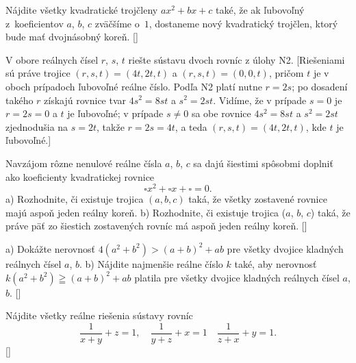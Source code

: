 {\D
Nájdite všetky kvadratické trojčleny
$ax^2  + bx + c$
také, že ak ľubovoľný z~koeficientov $a$, $b$, $c$ zväčšíme
o~$1$, dostaneme nový kvadratický trojčlen, ktorý bude mať
dvojnásobný koreň.
[]

V obore reálnych čísel $r$, $s$, $t$ riešte sústavu dvoch rovníc
z úlohy N2.
[Riešeniami sú práve trojice $(r,s,t)=(4t,2t,t)$ a
$(r,s,t)=(0,0,t)$, pričom $t$ je v oboch prípadoch ľubovoľné reálne
číslo. Podľa N2 platí nutne $r=2s$; po dosadení takého $r$
získajú rovnice tvar $4s^2=8st$ a $s^2=2st$. Vidíme, že v prípade
$s=0$ je $r=2s=0$ a $t$ je ľubovoľné; v prípade $s\ne0$ sa
obe rovnice $4s^2=8st$ a $s^2=2st$ zjednodušia na $s=2t$, takže
$r=2s=4t$, a teda $(r,s,t)=(4t,2t,t)$, kde $t$ je ľubovoľné.]

Navzájom rôzne nenulové reálne čísla $a$, $b$, $c$ sa dajú šiestimi spôsobmi
doplniť ako koeficienty kvadratickej rovnice
$$
\square x^2+\square x+\square=0.
$$
a) Rozhodnite, či existuje trojica $(a, b, c)$ taká, že
všetky zostavené rovnice majú aspoň jeden reálny koreň.
\hfill\break
b) Rozhodnite, či existuje trojica ($a$, $b$, $c$) taká, že
práve päť zo šiestich zostavených rovníc má aspoň jeden reálny koreň.
[]

a) Dokážte nerovnosť $4(a^2+b^2)>(a+b)^2+ab$ pre všetky dvojice
kladných reálnych čísel $a$, $b$.
\hfill\break
b) Nájdite najmenšie reálne číslo $k$ také, aby nerovnosť
$k(a^2+b^2)\geqq(a+b)^2+ab$ platila pre všetky dvojice kladných
reálnych čísel $a$, $b$.
[]

Nájdite všetky reálne riešenia sústavy rovníc
$$
\frac{1}{x+y} + z = 1, \quad \frac{1}{y+z} + x = 1 \quad
\frac{1}{z+x} + y = 1.
$$
[]

}

